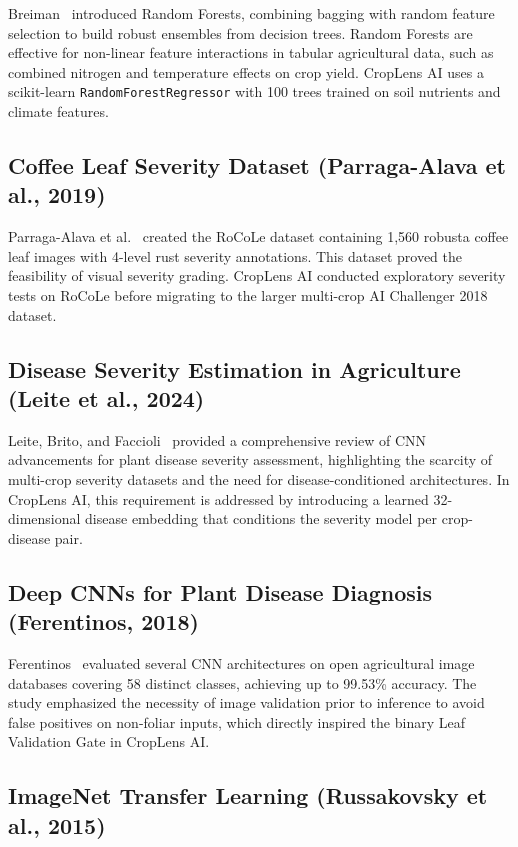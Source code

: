 Breiman~\cite{breiman2001} introduced Random Forests, combining bagging with random feature selection to build robust ensembles from decision trees. Random Forests are effective for non-linear feature interactions in tabular agricultural data, such as combined nitrogen and temperature effects on crop yield. CropLens AI uses a scikit-learn \texttt{RandomForestRegressor} with 100 trees trained on soil nutrients and climate features.

\subsection{Coffee Leaf Severity Dataset (Parraga-Alava et al., 2019)}

Parraga-Alava et al.~\cite{parraga2019} created the RoCoLe dataset containing 1,560 robusta coffee leaf images with 4-level rust severity annotations. This dataset proved the feasibility of visual severity grading. CropLens AI conducted exploratory severity tests on RoCoLe before migrating to the larger multi-crop AI Challenger 2018 dataset.

\subsection{Disease Severity Estimation in Agriculture (Leite et al., 2024)}

Leite, Brito, and Faccioli~\cite{leite2024} provided a comprehensive review of CNN advancements for plant disease severity assessment, highlighting the scarcity of multi-crop severity datasets and the need for disease-conditioned architectures. In CropLens AI, this requirement is addressed by introducing a learned 32-dimensional disease embedding that conditions the severity model per crop-disease pair.

\subsection{Deep CNNs for Plant Disease Diagnosis (Ferentinos, 2018)}

Ferentinos~\cite{ferentinos2018} evaluated several CNN architectures on open agricultural image databases covering 58 distinct classes, achieving up to 99.53\% accuracy. The study emphasized the necessity of image validation prior to inference to avoid false positives on non-foliar inputs, which directly inspired the binary Leaf Validation Gate in CropLens AI.

\subsection{ImageNet Transfer Learning (Russakovsky et al., 2015)}


